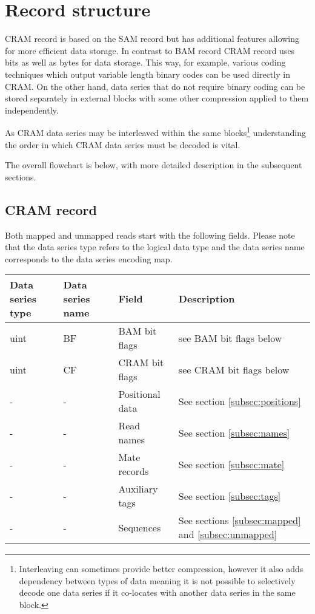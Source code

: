 \documentclass[a4paper]{article}
\begin{document}
\section{\textbf{Record structure}}
\label{sec:record}

CRAM record is based on the SAM record but has additional features allowing for 
more efficient data storage.  In contrast to BAM record CRAM record uses bits as 
well as bytes for data storage. This way, for example, various coding techniques 
which output variable length binary codes can be used directly in CRAM. On the 
other hand, data series that do not require binary coding can be stored separately 
in external blocks with some other compression applied to them independently.

As CRAM data series may be interleaved within the same blocks\footnote{Interleaving can sometimes provide better compression, however it also adds dependency between types of data meaning it is not possible to selectively decode one data series if it co-locates with another data series in the same block.} understanding the order in which CRAM data series must be decoded is vital.

The overall flowchart is below, with more detailed description in the subsequent sections.

\algnewcommand{}

\subsection{\textbf{CRAM record}}

Both mapped and unmapped reads start with the following fields. Please note that 
the data series type refers to the logical data type and the data series name corresponds 
to the data series encoding map.

\begin{tabular}{|>{\raggedright}p{70pt}|>{\raggedright}p{75pt}|>{\raggedright}p{90pt}|>{\raggedright}p{171pt}|}
\hline
\textbf{Data series type} & \textbf{Data series name} & \textbf{Field} & \textbf{Description}\tabularnewline
\hline
uint & BF & BAM bit flags & see BAM bit flags below\tabularnewline
\hline
uint & CF & CRAM bit flags & see CRAM bit flags below\tabularnewline
\hline
- & - & Positional data & See section \ref{subsec:positions}\tabularnewline
\hline
- & - & Read names & See section \ref{subsec:names}\tabularnewline
\hline
- & - & Mate records & See section \ref{subsec:mate}\tabularnewline
\hline
- & - & Auxiliary tags & See section \ref{subsec:tags}\tabularnewline
\hline
- & - & Sequences & See sections \ref{subsec:mapped} and \ref{subsec:unmapped}\tabularnewline
\hline
\end{tabular}
\end{document}
